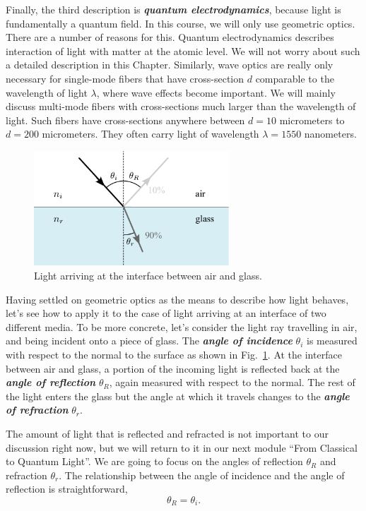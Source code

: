 Finally, the third description is \textit{\textbf{quantum electrodynamics}}, because light is fundamentally a quantum field.
In this course, we will only use geometric optics.
There are a number of reasons for this.
Quantum electrodynamics describes interaction of light with matter at the atomic level.
We will not worry about such a detailed description in this Chapter.
Similarly, wave optics are really only necessary for single-mode fibers that have cross-section $d$ comparable to the wavelength of light $\lambda$, where wave effects become important.
We will mainly discuss multi-mode fibers with cross-sections much larger than the wavelength of light.
Such fibers have cross-sections anywhere between $d=10$ micrometers to $d=200$ micrometers. 
They often carry light of wavelength $\lambda=1550$ nanometers.

\begin{figure}[t]
    \centering
    \includegraphics[width=0.65\textwidth]{lesson7/7-2_light-interface.pdf}
    \caption[Angle of incidence]{Light arriving at the interface between air and glass.}
    \label{fig:7-2_interface}
\end{figure}

Having settled on geometric optics as the means to describe how light behaves, let's see how to apply it to the case of light arriving at an interface of two different media.
To be more concrete, let's consider the light ray travelling in air, and being incident onto a piece of glass.
The \textit{\textbf{angle of incidence}} $\theta_i$ is measured with respect to the normal to the surface as shown in Fig.~\ref{fig:7-2_interface}.
At the interface between air and glass, a portion of the incoming light is reflected back at the \textit{\textbf{angle of reflection}} $\theta_R$, again measured with respect to the normal.
The rest of the light enters the glass but the angle at which it travels changes to the \textit{\textbf{angle of refraction}} $\theta_r$.

The amount of light that is reflected and refracted is not important to our discussion right now, but we will return to it in our next module ``From Classical to Quantum Light''.
We are going to focus on the angles of reflection $\theta_R$ and refraction $\theta_r$.
The relationship between the angle of incidence and the angle of reflection is straightforward,
\begin{equation}
    \theta_R = \theta_i.
\end{equation}


